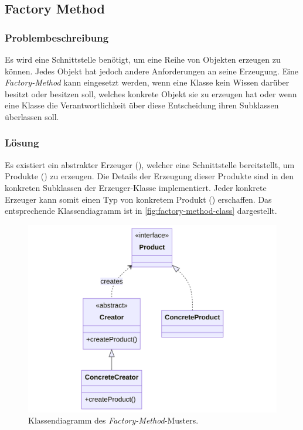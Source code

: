 \subsection{Factory Method}

\subsubsection*{Problembeschreibung}

Es wird eine Schnittstelle benötigt, um eine Reihe von Objekten erzeugen zu können. Jedes Objekt hat jedoch andere Anforderungen an seine Erzeugung. Eine \emph{Factory-Method} kann eingesetzt werden, wenn eine Klasse kein Wissen darüber besitzt oder besitzen soll, welches konkrete Objekt sie zu erzeugen hat oder wenn eine Klasse die Verantwortlichkeit über diese Entscheidung ihren Subklassen überlassen soll. \cite{gamma_design_1995}

\subsubsection*{Lösung}

Es existiert ein abstrakter Erzeuger (), welcher eine Schnittstelle bereitstellt, um Produkte () zu erzeugen. Die Details der Erzeugung dieser Produkte sind in den konkreten Subklassen der Erzeuger-Klasse implementiert. Jeder konkrete Erzeuger kann somit einen Typ von konkretem Produkt () erschaffen. Das entsprechende Klassendiagramm ist in \autoref{fig:factory-method-class} dargestellt.

\begin{figure}[!ht]
	\centering
	\includegraphics[width=0.75\linewidth]{images/patterns/factory-method-class.png}
	\caption{Klassendiagramm des \emph{Factory-Method}-Musters. \cite{skobeleva_factory_2023}}
	\label{fig:factory-method-class}
\end{figure}

